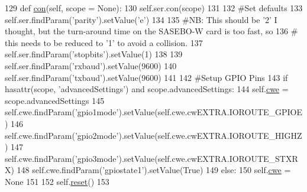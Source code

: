 \begin{DoxyCode}
129     \textcolor{keyword}{def }\hyperlink{classsoftware_1_1chipwhisperer_1_1capture_1_1targets_1_1smartcard__readers_1_1chipwhisperer__ser_1_1ReaderChipWhispererSER_ab08bebdffcacb12c7a426f2575688cd4}{con}(self, scope = None):
130         self.ser.con(scope)
131 
132         \textcolor{comment}{#Set defaults}
133         self.ser.findParam(\textcolor{stringliteral}{'parity'}).setValue(\textcolor{stringliteral}{'e'})
134 
135         \textcolor{comment}{#NB: This should be '2' I thought, but the turn-around time on the SASEBO-W card is too fast, so}
136         \textcolor{comment}{#    this needs to be reduced to '1' to avoid a collision.}
137         self.ser.findParam(\textcolor{stringliteral}{'stopbits'}).setValue(1)
138 
139         self.ser.findParam(\textcolor{stringliteral}{'rxbaud'}).setValue(9600)
140         self.ser.findParam(\textcolor{stringliteral}{'txbaud'}).setValue(9600)
141 
142         \textcolor{comment}{#Setup GPIO Pins}
143         \textcolor{keywordflow}{if} hasattr(scope, \textcolor{stringliteral}{'advancedSettings'}) \textcolor{keywordflow}{and} scope.advancedSettings:
144             self.\hyperlink{classsoftware_1_1chipwhisperer_1_1capture_1_1targets_1_1smartcard__readers_1_1chipwhisperer__ser_1_1ReaderChipWhispererSER_a5dfe180325e6f917464786a4c1cb811f}{cwe} = scope.advancedSettings
145             self.cwe.findParam(\textcolor{stringliteral}{'gpio1mode'}).setValue(self.cwe.cwEXTRA.IOROUTE\_GPIOE)
146             self.cwe.findParam(\textcolor{stringliteral}{'gpio2mode'}).setValue(self.cwe.cwEXTRA.IOROUTE\_HIGHZ)
147             self.cwe.findParam(\textcolor{stringliteral}{'gpio3mode'}).setValue(self.cwe.cwEXTRA.IOROUTE\_STXRX)
148             self.cwe.findParam(\textcolor{stringliteral}{'gpiostate1'}).setValue(\textcolor{keyword}{True})
149         \textcolor{keywordflow}{else}:
150             self.\hyperlink{classsoftware_1_1chipwhisperer_1_1capture_1_1targets_1_1smartcard__readers_1_1chipwhisperer__ser_1_1ReaderChipWhispererSER_a5dfe180325e6f917464786a4c1cb811f}{cwe} = \textcolor{keywordtype}{None}
151 
152         self.\hyperlink{classsoftware_1_1chipwhisperer_1_1capture_1_1targets_1_1smartcard__readers_1_1chipwhisperer__ser_1_1ReaderChipWhispererSER_ac59b531b187c8dc232e933b31099ecb8}{reset}()
153 
\end{DoxyCode}
\hypertarget{classsoftware_1_1chipwhisperer_1_1capture_1_1targets_1_1smartcard__readers_1_1chipwhisperer__ser_1_1ReaderChipWhispererSER_a1e8dfcbf46f9b735e35c0aa2089a3e11}{}
